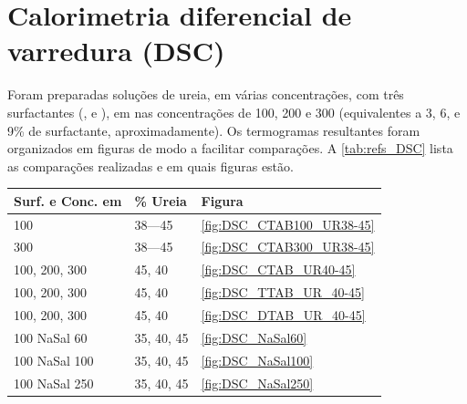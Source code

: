 \section{Calorimetria diferencial de varredura (DSC)}

	Foram preparadas soluções de ureia, em várias concentrações, com três surfactantes (\CTAB, \TTAB{} e \DTAB), em nas concentrações de 100, 200 e 300 \mM{} (equivalentes a 3, 6, e 9\% de surfactante, aproximadamente). Os termogramas resultantes foram organizados em figuras de modo a facilitar comparações. A \autoref{tab:refs_DSC} lista as comparações realizadas e em quais figuras estão.
    
    \begin{table}[h]
            {%
            \begin{tabular}{l p{1.5cm} p{1.5cm}}
                \toprule
				Surf. e Conc. em \mM             & \% Ureia		 & Figura 			\\
    			\midrule
				\CTAB{} 100	                     & 38---45		 & \ref{fig:DSC_CTAB100_UR38-45}\\
				\CTAB{} 300	                     & 38---45		 & \ref{fig:DSC_CTAB300_UR38-45}\\
				\CTAB{} 100, 200, 300	             & 45, 40	     & \ref{fig:DSC_CTAB_UR40-45}	\\
				\TTAB{} 100, 200, 300	             & 45, 40	     & \ref{fig:DSC_TTAB_UR_40-45}	\\
				\DTAB{} 100, 200, 300	             & 45, 40	     & \ref{fig:DSC_DTAB_UR_40-45}	\\
    			\midrule
				\CTAB{} 100 NaSal 60	             & 35, 40, 45	 & \ref{fig:DSC_NaSal60}		\\
				\CTAB{} 100 NaSal 100	             & 35, 40, 45	 & \ref{fig:DSC_NaSal100}	\\
				\CTAB{} 100 NaSal 250	             & 35, 40, 45	 & \ref{fig:DSC_NaSal250}	\\
    			\bottomrule
            \end{tabular}%
            }{}
    \end{table}
	

